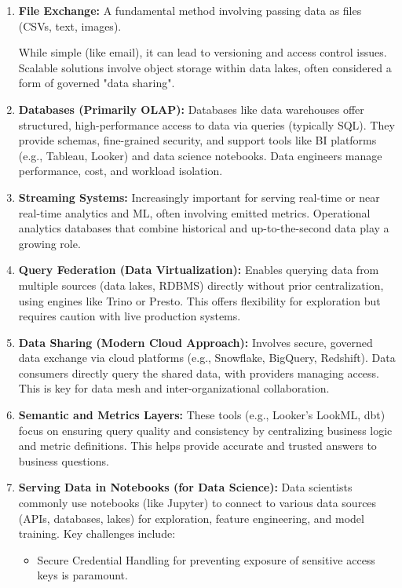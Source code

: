 \begin{enumerate}
    \item \textbf{File Exchange:} A fundamental method
    involving passing data as files (CSVs, text, images).
    
    While simple (like email), it can lead to versioning
    and access control issues. Scalable solutions involve
    object storage within data lakes, often considered
    a form of governed "data sharing".

    \item \textbf{Databases (Primarily OLAP):} 
    Databases like data warehouses offer structured,
    high-performance access to data via queries
    (typically SQL). They provide schemas, fine-grained
    security, and support tools like BI platforms
    (e.g., Tableau, Looker) and data science notebooks.
    Data engineers manage performance, cost, and
    workload isolation.

    \item \textbf{Streaming Systems:}  Increasingly
    important for serving real-time or near real-time
    analytics and ML, often involving emitted metrics.
    Operational analytics databases that combine
    historical and up-to-the-second data play a
    growing role.

    \item \textbf{Query Federation (Data Virtualization):}
    Enables querying data from multiple sources
    (data lakes, RDBMS) directly without prior
    centralization, using engines like Trino or Presto.
    This offers flexibility for exploration but
    requires caution with live production systems.

    \item \textbf{Data Sharing (Modern Cloud Approach):}
    Involves secure, governed data exchange via cloud platforms
    (e.g., Snowflake, BigQuery, Redshift). Data consumers
    directly query the shared data, with providers managing
    access. This is key for data mesh and inter-organizational
    collaboration.

    \item \textbf{Semantic and Metrics Layers:}
    These tools (e.g., Looker's LookML, dbt) focus on ensuring
    query quality and consistency by centralizing business
    logic and metric definitions. This helps provide accurate
    and trusted answers to business questions.

    \item \textbf{Serving Data in Notebooks (for Data Science):}
    Data scientists commonly use notebooks (like Jupyter) to
    connect to various data sources (APIs, databases, lakes)
    for exploration, feature engineering, and model training.
    Key challenges include:
    \begin{itemize}
        \item Secure Credential Handling for preventing
        exposure of sensitive access keys is paramount.


\end{itemize}
\end{enumerate}
